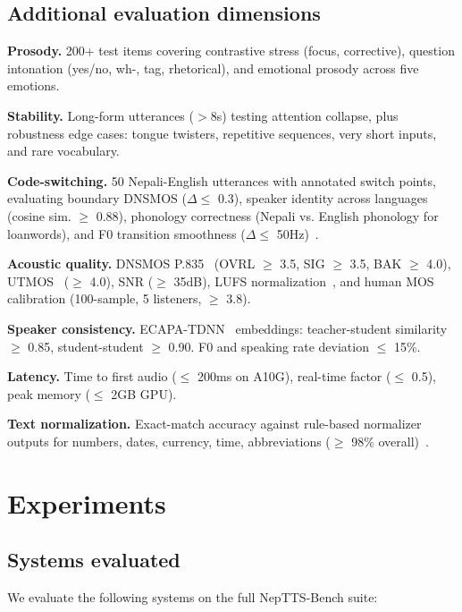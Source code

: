 \documentclass{Interspeech}
\begin{document}
\subsection{Additional evaluation dimensions}

\textbf{Prosody.} 200+ test items covering contrastive stress (focus, corrective), question intonation (yes/no, wh-, tag, rhetorical), and emotional prosody across five emotions.

\textbf{Stability.} Long-form utterances ($>$8s) testing attention collapse, plus robustness edge cases: tongue twisters, repetitive sequences, very short inputs, and rare vocabulary.

\textbf{Code-switching.} 50 Nepali-English utterances with annotated switch points, evaluating boundary DNSMOS ($\Delta \leq$ 0.3), speaker identity across languages (cosine sim. $\geq$ 0.88), phonology correctness (Nepali vs. English phonology for loanwords), and F0 transition smoothness ($\Delta \leq$ 50Hz)~\cite{Sitaram2016, Gurung2019}.

\textbf{Acoustic quality.} DNSMOS P.835~\cite{DNSMOS2022} (OVRL $\geq$ 3.5, SIG $\geq$ 3.5, BAK $\geq$ 4.0), UTMOS~\cite{UTMOS2022} ($\geq$ 4.0), SNR ($\geq$ 35dB), LUFS normalization~\cite{EBUR128}, and human MOS calibration (100-sample, 5 listeners, $\geq$ 3.8).

\textbf{Speaker consistency.} ECAPA-TDNN~\cite{ECAPATDNN2020} embeddings: teacher-student similarity $\geq$ 0.85, student-student $\geq$ 0.90. F0 and speaking rate deviation $\leq$ 15\%.

\textbf{Latency.} Time to first audio ($\leq$ 200ms on A10G), real-time factor ($\leq$ 0.5), peak memory ($\leq$ 2GB GPU).

\textbf{Text normalization.} Exact-match accuracy against rule-based normalizer outputs for numbers, dates, currency, time, abbreviations ($\geq$ 98\% overall)~\cite{Sproat2016, Bali2007}.


\section{Experiments}

\subsection{Systems evaluated}

We evaluate the following systems on the full NepTTS-Bench suite:
\end{document}
